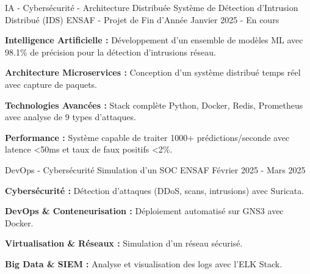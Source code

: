 
\begin{cventries}

    \cventry
    {IA - Cybersécurité - Architecture Distribuée}
    {Système de Détection d'Intrusion Distribué (IDS)} %
    {ENSAF - Projet de Fin d'Année} %
    {Janvier 2025 - En cours} %
    {
        \begin{cvitems} %
            \item {
                        \textbf{Intelligence Artificielle :}
                        Développement d'un ensemble de modèles ML avec 98.1\% de précision pour la détection d'intrusions réseau.}
            \item {
                        \textbf{Architecture Microservices :}
                        Conception d'un système distribué temps réel avec capture de paquets.}
            \item {
                        \textbf{Technologies Avancées :}
                        Stack complète Python, Docker, Redis, Prometheus avec analyse de 9 types d'attaques.}
            \item {
                        \textbf{Performance :}
                        Système capable de traiter 1000+ prédictions/seconde avec latence <50ms et taux de faux positifs <2\%.}
        \end{cvitems}
    }

    \cventry
    {DevOps - Cybersécurité}
    {Simulation d'un SOC} %
    {ENSAF} %
    {Février 2025 - Mars 2025} %
    {
        \begin{cvitems} %
            \item {
                        \textbf{Cybersécurité :}
                        Détection d'attaques (DDoS, scans, intrusions) avec Suricata.}
            \item {
                        \textbf{DevOps \& Conteneurisation :}
                        Déploiement automatisé sur GNS3 avec Docker.}
            \item {
                        \textbf{Virtualisation \& Réseaux :}
                        Simulation d'un réseau sécurisé.}
            \item {
                        \textbf{Big Data \& SIEM :}
                        Analyse et visualisation des logs avec l'ELK Stack.}
        \end{cvitems}
    }

\end{cventries}
